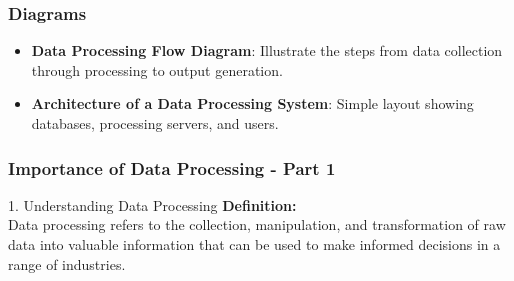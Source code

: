 \documentclass[aspectratio=169]{beamer}
\begin{document}
\begin{frame}[fragile]
    \frametitle{Diagrams}
    \begin{itemize}
        \item \textbf{Data Processing Flow Diagram}: Illustrate the steps from data collection through processing to output generation.
        \item \textbf{Architecture of a Data Processing System}: Simple layout showing databases, processing servers, and users.
    \end{itemize}
\end{frame}

\begin{frame}[fragile]
    \frametitle{Importance of Data Processing - Part 1}
    \begin{block}{1. Understanding Data Processing}
        \textbf{Definition:} \\
        Data processing refers to the collection, manipulation, and transformation of raw data into valuable information that can be used to make informed decisions in a range of industries.
    \end{block}
\end{frame}
\end{document}
